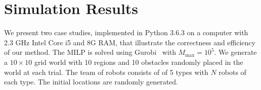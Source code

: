 \documentclass[Afour,sageh,times]{sagej}
\renewcommand{\ap}[3]{\mathcal{\pi}_{{#1},{#2}}^{#3}}
\newcommand{\RNum}[1]{\uppercase\expandafter{\romannumeral #1\relax}}
\begin{document}
{{\section{Simulation Results}\label{sec:sim}
We present two case studies, implemented in Python 3.6.3 on a computer with 2.3 GHz Intel Core i5 and 8G RAM, that illustrate the correctness and efficiency of our method. The MILP is solved using Gurobi~\citep{gurobi} with $M_{\text{max}}=10^5$. We generate a  $10\times 10$ grid world with 10 regions and 10 obstacles randomly placed in the world at each trial. The team of robots consists of of 5 types with $N$ robots of each type. The initial locations are randomly generated.


}}
\end{document}

